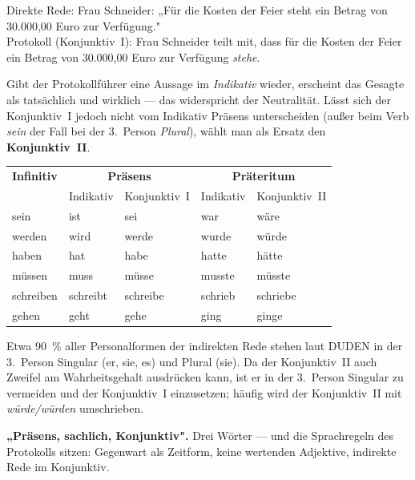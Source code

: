 \documentclass[11pt, a4paper]{article}
\begin{document}
\begin{beispiel}
Direkte Rede: Frau Schneider: „Für die Kosten der Feier steht ein Betrag von
30.000,00 Euro zur Verfügung."\\[0.4em]
Protokoll (Konjunktiv~I): Frau Schneider teilt mit, dass für die Kosten der Feier ein
Betrag von 30.000,00 Euro zur Verfügung \emph{stehe}.
\end{beispiel}

Gibt der Protokollführer eine Aussage im \emph{Indikativ} wieder, erscheint das Gesagte
als tatsächlich und wirklich --- das widerspricht der Neutralität. Lässt sich der
Konjunktiv~I jedoch nicht vom Indikativ Präsens unterscheiden (außer beim Verb \emph{sein}
der Fall bei der 3.\ Person \emph{Plural}), wählt man als Ersatz den \textbf{Konjunktiv~II}.

\begin{center}
\begin{tabular}{l l l l l}
\toprule
\textbf{Infinitiv} & \multicolumn{2}{c}{\textbf{Präsens}} & \multicolumn{2}{c}{\textbf{Präteritum}}\\
 & Indikativ & Konjunktiv~I & Indikativ & Konjunktiv~II\\
\midrule
sein & ist & sei & war & wäre\\
werden & wird & werde & wurde & würde\\
haben & hat & habe & hatte & hätte\\
müssen & muss & müsse & musste & müsste\\
schreiben & schreibt & schreibe & schrieb & schriebe\\
gehen & geht & gehe & ging & ginge\\
\bottomrule
\end{tabular}
\end{center}

\medskip
Etwa 90~\% aller Personalformen der indirekten Rede stehen laut DUDEN in der 3.\ Person
Singular (er, sie, es) und Plural (sie). Da der Konjunktiv~II auch Zweifel am
Wahrheitsgehalt ausdrücken kann, ist er in der 3.\ Person Singular zu vermeiden und der
Konjunktiv~I einzusetzen; häufig wird der Konjunktiv~II mit \emph{würde/würden}
umschrieben.

\begin{eselsbruecke}
\textbf{„Präsens, sachlich, Konjunktiv".} Drei Wörter --- und die Sprachregeln des
Protokolls sitzen: Gegenwart als Zeitform, keine wertenden Adjektive, indirekte Rede im
Konjunktiv.
\end{eselsbruecke}
\end{document}
